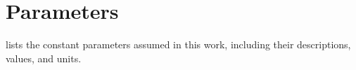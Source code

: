 \documentclass[a4paper,fleqn,colorlinks,unicode,lineno]{cas-dc} %
\begin{document}


\section{Parameters}
\label{sec:appendix-parameters}
 lists the constant parameters assumed in this work, including their descriptions, values, and units.
\end{document}
